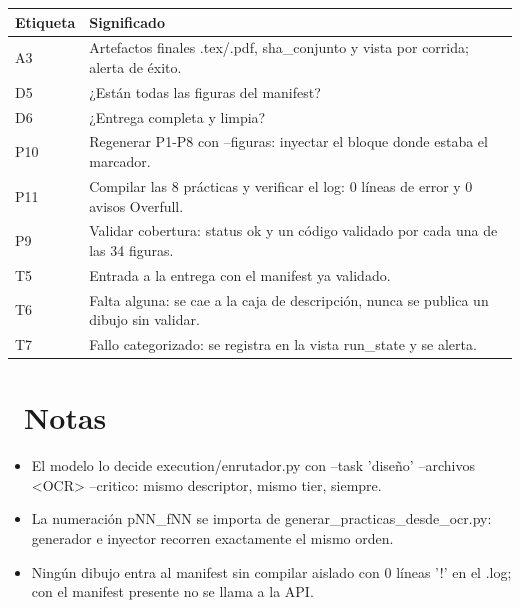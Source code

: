 \documentclass[11pt,a4paper]{article}
\newcommand{\iconotexto}[2]{\textcolor{cyanNeon}{\faIcon{#1}}~#2}
\begin{document}
\vspace{6pt}
\begin{tcolorbox}[cajaContenido, title={\faIcon{table}~Leyenda de etiquetas}]
\small
\begin{tabularx}{\linewidth}{@{}>{\centering\arraybackslash}p{1.4cm}X@{}}
\toprule
\textbf{Etiqueta} & \textbf{Significado} \\ \midrule
A3 & Artefactos finales .tex/.pdf, sha\_conjunto y vista por corrida; alerta de éxito. \\
D5 & ¿Están todas las figuras del manifest? \\
D6 & ¿Entrega completa y limpia? \\
P10 & Regenerar P1-P8 con --figuras: inyectar el bloque donde estaba el marcador. \\
P11 & Compilar las 8 prácticas y verificar el log: 0 líneas de error y 0 avisos Overfull. \\
P9 & Validar cobertura: status ok y un código validado por cada una de las 34 figuras. \\
T5 & Entrada a la entrega con el manifest ya validado. \\
T6 & Falta alguna: se cae a la caja de descripción, nunca se publica un dibujo sin validar. \\
T7 & Fallo categorizado: se registra en la vista run\_state y se alerta. \\
\bottomrule
\end{tabularx}
\end{tcolorbox}


\section{\iconotexto{sticky-note}{Notas}}
\begin{itemize}
\item El modelo lo decide execution/enrutador.py con --task 'diseño' --archivos <OCR> --critico: mismo descriptor, mismo tier, siempre.
\item La numeración pNN\_fNN se importa de generar\_practicas\_desde\_ocr.py: generador e inyector recorren exactamente el mismo orden.
\item Ningún dibujo entra al manifest sin compilar aislado con 0 líneas '!' en el .log; con el manifest presente no se llama a la API.
\end{itemize}

\end{document}
